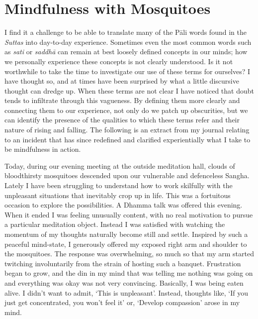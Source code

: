 
\chapter{Mindfulness with Mosquitoes}
\markright{\theChapterAuthor}

I find it a challenge to be able to translate many of the Pāli words
found in the \emph{Suttas} into day-to-day experience. Sometimes even the most
common words such as \emph{sati} or \emph{saddhā} can remain at best
loosely defined concepts in our minds; how we personally experience
these concepts is not clearly understood. Is it not worthwhile to take
the time to investigate our use of these terms for ourselves? I have
thought so, and at times have been surprised by what a little discursive
thought can dredge up. When these terms are not clear I have noticed
that doubt tends to infiltrate through this vagueness. By defining them
more clearly and connecting them to our experience, not only do we patch
up obscurities, but we can identify the presence of the qualities to
which these terms refer and their nature of rising and falling. The
following is an extract from my journal relating to an incident that has
since redefined and clarified experientially what I take to be
mindfulness in action. 

Today, during our evening meeting at the outside meditation hall, clouds
of bloodthirsty mosquitoes descended upon our vulnerable and defenceless
Sangha. Lately I have been struggling to understand how to work
skilfully with the unpleasant situations that inevitably crop up in
life. This was a fortuitous occasion to explore the possibilities. A
Dhamma talk was offered this evening. When it ended I was feeling
unusually content, with no real motivation to pursue a particular
meditation object. Instead I was satisfied with watching the momentum of
my thoughts naturally become still and settle. Inspired by such a
peaceful mind-state, I generously offered my exposed right arm and
shoulder to the mosquitoes. The response was overwhelming, so much so
that my arm started twitching involuntarily from the strain of hosting
such a banquet. Frustration began to grow, and the din in my mind that
was telling me nothing was going on and everything was okay was not very
convincing. Basically, I was being eaten alive. I didn't want to admit, 
`This is unpleasant'. Instead, thoughts like, `If you just get
concentrated, you won't feel it' or, `Develop compassion' arose in my
mind. 

